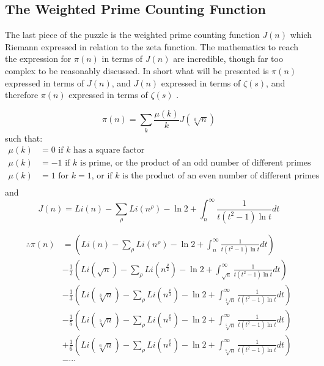 \subsection{The Weighted Prime Counting Function} \label{The Weighted Prime Counting Function}
The last piece of the puzzle is the weighted prime counting function $J(n)$ which Riemann expressed in relation to the zeta function. The mathematics to reach the expression for $\pi(n)$ in terms of $J(n)$ are incredible, though far too complex to be reasonably discussed. In short what will be presented is $\pi(n)$ expressed in terms of $J(n)$, and $J(n)$ expressed in terms of $\zeta(s)$, and therefore $\pi(n)$ expressed in terms of $\zeta(s)$ \citep[pp.249, 302, 328]{derbyshire2003prime}. 

\begin{equation} \label{eq:pi(n)fromJ(n)}
\pi(n) = \sum_{k} \frac{\mu(k)}{k} J(\sqrt[k]{n})
\end{equation}
such that:
\begin{equation*}\label{eq:mu}
\begin{split}
\mu(k) &= 0 \text{ if $k$ has a square factor} \\
\mu(k) &= -1 \text{ if $k$ is prime, or the product of an odd number of different primes} \\
\mu(k) &= 1 \text{ for $k = 1$, or if $k$ is the product of an even number of different primes} \\
\end{split}
\end{equation*}
and
\begin{equation*} 
	J(n) = Li(n) - \sum_{\rho}Li(n^{\rho}) - \ln 2 + \int_{n}^{\infty}\frac{1}{t(t^2-1)\ln t} dt
\end{equation*}

\begin{equation} \label{eq:ExampleOfFinalPi(n)}
\begin{split}
	\therefore \pi(n) &= \left (Li(n) - \sum_{\rho}Li(n^{\rho}) - \ln 2 + \int_{n}^{\infty}\frac{1}{t(t^2-1)\ln t} dt \right )\\
	& - \frac{1}{2} \left (Li(\sqrt{n}) - \sum_{\rho}Li(n^{\frac{\rho}{2}}) - \ln 2 + \int_{\sqrt{n}}^{\infty}\frac{1}{t(t^2-1)\ln t} dt \right )\\
	& - \frac{1}{3} \left (Li(\sqrt[3]{n}) - \sum_{\rho}Li(n^{\frac{\rho}{3}}) - \ln 2 + \int_{\sqrt[3]{n}}^{\infty}\frac{1}{t(t^2-1)\ln t} dt \right )\\
	& - \frac{1}{5} \left (Li(\sqrt[5]{n}) - \sum_{\rho}Li(n^{\frac{\rho}{5}}) - \ln 2 + \int_{\sqrt[5]{n}}^{\infty}\frac{1}{t(t^2-1)\ln t} dt \right )\\
	&  + \frac{1}{6} \left (Li(\sqrt[6]{n}) - \sum_{\rho}Li(n^{\frac{\rho}{6}}) - \ln 2 + \int_{\sqrt[6]{n}}^{\infty}\frac{1}{t(t^2-1)\ln t} dt \right )\\
	&- \cdots
\end{split}
\end{equation}


